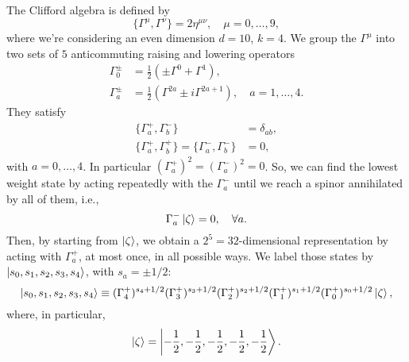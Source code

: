 \begin{mdframed}
The Clifford algebra is defined by
\begin{equation}\label{eq:clifford}
    \{ \Gamma^\mu, \Gamma^\nu \} = 2 \eta^{\mu\nu} , \quad \mu = 0, \dots, 9,
\end{equation}
where we're considering an even dimension $d = 10$, $k=4$. We group the $\Gamma^\mu$ into two sets of $5$ anticommuting raising and lowering operators
\begin{subequations}
\begin{align}
    \Gamma^\pm_0 &= \frac{1}{2} (\pm \Gamma^0 + \Gamma^1), \label{eq:gamma-zero-pm}\\
    \Gamma^\pm_a &= \frac{1}{2}(\Gamma^{2a} \pm i \Gamma^{2a+1}), \quad a = 1, \dots, 4 .\label{eq:gamma-a-pm}
\end{align}
\end{subequations}
They satisfy
\begin{subequations}
\begin{align}
    \{ \Gamma^+_a, \Gamma^-_b \} &= \delta_{ab} , \\
    \{ \Gamma^+_a, \Gamma^+_b \} = \{ \Gamma^-_a, \Gamma^-_b \} &= 0 ,
\end{align}
\end{subequations}
with $a = 0, \dots, 4$. In particular $(\Gamma^+_a)^2=(\Gamma^-_a)^2=0$. So, we can find the lowest weight state by acting repeatedly with the $\Gamma^-_a$ until we reach a spinor annihilated by all of them, i.e.,
\begin{equation}
    \Gamma^-_a \ket{\zeta} = 0, \quad \forall a .
\end{equation}
Then, by starting from $\ket{\zeta}$, we obtain a $2^5 = 32$-dimensional representation by acting with $\Gamma^+_a$, at most once, in all possible ways. We label those states by $\ket{s_0,s_1,s_2,s_3,s_4}$, with $s_a = \pm 1/2$:
\begin{equation}
    \ket{s_0,s_1,s_2,s_3,s_4} \equiv (\Gamma^+_4)^{s_4 + 1/2} (\Gamma^+_3)^{s_3 + 1/2} (\Gamma^+_2)^{s_2 + 1/2} (\Gamma^+_1)^{s_1 + 1/2} (\Gamma^+_0)^{s_0 + 1/2} \ket{\zeta},
\end{equation}
where, in particular,
\begin{equation}
    \ket{\zeta} = \ket{-\frac{1}{2},-\frac{1}{2},-\frac{1}{2},-\frac{1}{2},-\frac{1}{2}}.
\end{equation}


\end{mdframed}
